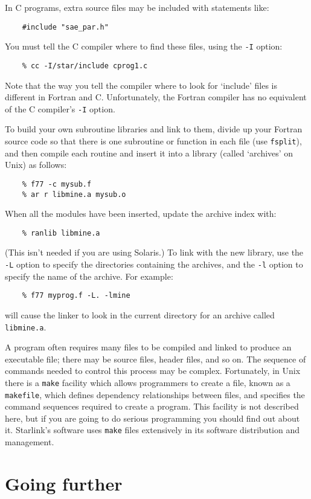 \documentclass[twoside,11pt]{article}
\begin{document}
In C programs, extra source files may be included with statements like:
\begin{verbatim}
    #include "sae_par.h"
\end{verbatim}
You must tell the C compiler where to find these files, using the {\tt -I}
option:
\begin{verbatim}
    % cc -I/star/include cprog1.c
\end{verbatim}
Note that the way you tell the compiler where to look for `include' files is
different in Fortran and C.
Unfortunately, the Fortran compiler has no equivalent of the C compiler's
{\tt -I} option.

To build your own subroutine libraries and link to them, divide up your
Fortran source code so that there is one subroutine or function in each file
(use {\tt fsplit}), and then compile each routine and insert it into a library
(called `archives' on Unix) as follows:
\begin{verbatim}
    % f77 -c mysub.f
    % ar r libmine.a mysub.o
\end{verbatim}
When all the modules have been inserted, update the archive index with:
\begin{verbatim}
    % ranlib libmine.a
\end{verbatim}
(This isn't needed if you are using Solaris.)
To link with the new library, use the {\tt -L} option to specify the directories
containing the archives, and the {\tt -l} option to specify the name of the
archive.
For example:
\begin{verbatim}
    % f77 myprog.f -L. -lmine
\end{verbatim}
will cause the linker to look in the current directory for an archive called
{\tt libmine.a}.

A program often requires many files to be compiled and linked to produce an
executable file; there may be source files, header files, and so on.
The sequence of commands needed to control this process may be complex.
Fortunately, in Unix there is a {\tt make} facility which allows programmers to
create a file, known as a {\tt makefile}, which defines dependency
relationships between files, and specifies the command sequences required to
create a program.
This facility is not described here, but if you are going to do serious
programming you should find out about it.
Starlink's software uses {\tt make} files extensively in its software
distribution and management.

\newpage

\section{Going further}
\end{document}
